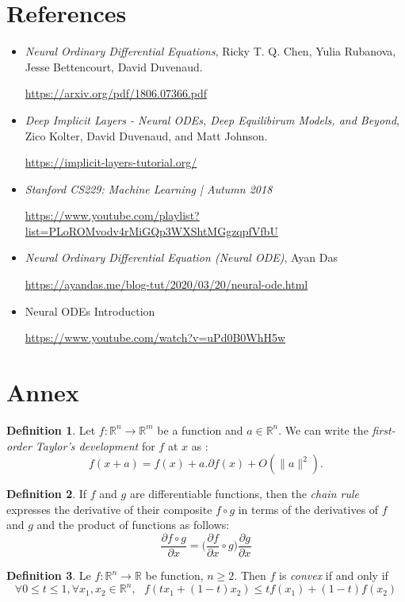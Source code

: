 \documentclass[10pt,a4paper]{article}
\theoremstyle{definition}
\newtheorem{definition}{Definition}
\theoremstyle{definition}
\theoremstyle{definition}
\begin{document}
\newpage
\section{References}
\begin{itemize}
\item  \textit{Neural Ordinary Differential Equations}, Ricky T. Q. Chen, Yulia Rubanova, Jesse Bettencourt, David Duvenaud.

\url{https://arxiv.org/pdf/1806.07366.pdf}
\item \textit{Deep Implicit Layers - Neural ODEs, Deep Equilibirum Models, and Beyond}, Zico Kolter, David Duvenaud, and Matt Johnson.

\url{https://implicit-layers-tutorial.org/}
\item\textit{Stanford CS229: Machine Learning | Autumn 2018}

\url{https://www.youtube.com/playlist?list=PLoROMvodv4rMiGQp3WXShtMGgzqpfVfbU}
\item \textit{Neural Ordinary Differential Equation (Neural ODE)}, Ayan Das

\url{https://ayandas.me/blog-tut/2020/03/20/neural-ode.html}
\item Neural ODEs Introduction

\url{https://www.youtube.com/watch?v=uPd0B0WhH5w}
\end{itemize}

\newpage
\section{Annex}
\begin{definition}
Let $f: \mathbb{R}^n \rightarrow \mathbb{R}^m$ be a function and $a\in \mathbb{R}^n$.
We can write the \textit{first-order Taylor's development} for $f$ at $x$ as :
$$
f(x + a) = f(x) + a . \partial f(x) + O(\| a\|^2).
$$
\end{definition}
\begin{definition}
If $f$ and $g$ are differentiable functions, then the \textit{chain rule} expresses the derivative of their composite $f \circ g$ in terms of the derivatives of $f$ and $g$ and the product of functions as follows:
$$
\frac{\partial f \circ g}{\partial x} = \Big(\frac{\partial f}{\partial x} \circ g\Big)\frac{\partial g}{\partial x}
$$
\end{definition}
\begin{definition}
Le $f: \mathbb{R}^n \rightarrow \mathbb{R}$ be function, $n\geq 2$. Then $f$ is \textit{convex} if and only if
$$
\forall 0\leq t \leq 1, \forall x_1,x_2\in \mathbb{R}^n, \ \ \ f(tx_1 + (1-t)x_2) \leq tf(x_1) + (1-t)f(x_2)
$$
\end{definition}
\end{document}
